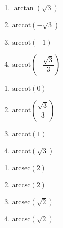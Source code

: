 \begin{multicols}{4}

\begin{enumerate}

\setcounter{enumi}{\value{HW}}

\item $\arctan \left( \sqrt{3} \right)$ 
\item $\mbox{arccot} \left( -\sqrt{3} \right)$ 
\item $\mbox{arccot} \left( -1 \right)$ 
\item $\mbox{arccot} \left( -\dfrac{\sqrt{3}}{3} \right)$

\setcounter{HW}{\value{enumi}}

\end{enumerate}

\end{multicols}

\begin{multicols}{4}

\begin{enumerate}

\setcounter{enumi}{\value{HW}}

\item $\mbox{arccot} \left( 0 \right)$ 
\item $\mbox{arccot} \left( \dfrac{\sqrt{3}}{3} \right)$
\item $\mbox{arccot} \left( 1 \right)$ 
\item $\mbox{arccot} \left( \sqrt{3} \right)$ 

\setcounter{HW}{\value{enumi}}

\end{enumerate}

\end{multicols}

\begin{multicols}{4}

\begin{enumerate}

\setcounter{enumi}{\value{HW}}

\item $\mbox{arcsec} \left( 2 \right)$
\item $\mbox{arccsc} \left( 2 \right)$
\item $\mbox{arcsec} \left( \sqrt{2} \right)$
\item $\mbox{arccsc} \left( \sqrt{2} \right)$

\setcounter{HW}{\value{enumi}}

\end{enumerate}

\end{multicols}

